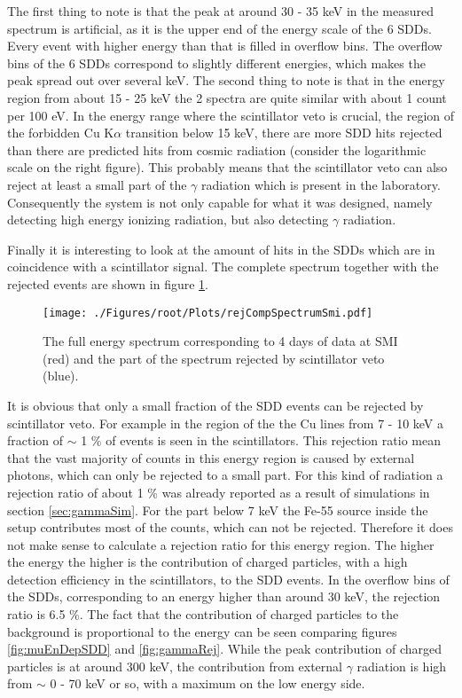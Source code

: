 The first thing to note is that the peak at around 30 - 35 keV in the measured spectrum is artificial, as it is the upper end of the energy scale of the 6 SDDs. Every event with higher energy than that is filled in overflow bins. The overflow bins of the 6 SDDs correspond to slightly different energies, which makes the peak spread out over several keV. The second thing to note is that in the energy region from about 15 - 25 keV the 2 spectra are quite similar with about 1 count per 100 eV. In the energy range where the scintillator veto is crucial, the region of the forbidden Cu K$\alpha$ transition below 15 keV, there are more SDD hits rejected than there are predicted hits from cosmic radiation (consider the logarithmic scale on the right figure). This probably means that the scintillator veto can also reject at least a small part of the $\gamma$ radiation which is present in the laboratory. Consequently the system is not only capable for what it was designed, namely detecting high energy ionizing radiation, but also detecting $\gamma$ radiation. 

Finally it is interesting to look at the amount of hits in the SDDs which are in coincidence with a scintillator signal.  The complete spectrum together with the rejected events are shown in figure \ref{fig:rejCompSpectrumSmi}.
\begin{figure}[h]
 \centering
 \texttt{[image: ./Figures/root/Plots/rejCompSpectrumSmi.pdf]}
 \caption{The full energy spectrum corresponding to 4 days of data at SMI (red) and the part of the spectrum rejected by scintillator veto (blue).}
 \label{fig:rejCompSpectrumSmi}
\end{figure}
It is obvious that only a small fraction of the SDD events can be rejected by scintillator veto. For example in the region of the the Cu lines from 7 - 10 keV a fraction of $\sim$ 1 \% of events is seen in the scintillators. This rejection ratio mean that the vast majority of counts in this energy region is caused by external photons, which can only be rejected to a small part. For this kind of radiation a rejection ratio of about 1 \% was already reported as a result of simulations in section \ref{sec:gammaSim}. For the part below 7 keV the Fe-55 source inside the setup contributes most of the counts, which can not be rejected. Therefore it does not make sense to calculate a rejection ratio for this energy region. The higher the energy the higher is the contribution of charged particles, with a high detection efficiency in the scintillators, to the SDD events. In the overflow bins of the SDDs, corresponding to an energy higher than around 30 keV, the rejection ratio is 6.5 \%. The fact that  the contribution of charged particles to the background is proportional to the energy can be seen comparing figures \ref{fig:muEnDepSDD} and \ref{fig:gammaRej}. While the peak contribution of charged particles is at around 300 keV, the contribution from external $\gamma$ radiation is high from $\sim$ 0 - 70 keV or so, with a maximum on the low energy side.

